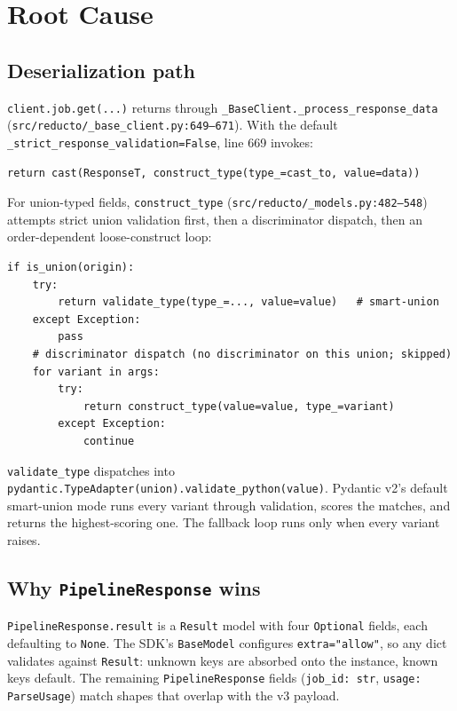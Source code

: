 \documentclass[11pt]{article}
\begin{document}
\section{Root Cause}

\subsection{Deserialization path}

\texttt{client.job.get(...)} returns through \texttt{\_BaseClient.\_process\_response\_data} (\texttt{src/reducto/\_base\_client.py:649--671}). With the default \texttt{\_strict\_response\_validation=False}, line 669 invokes:

\begin{lstlisting}[style=py]
return cast(ResponseT, construct_type(type_=cast_to, value=data))
\end{lstlisting}

For union-typed fields, \texttt{construct\_type} (\texttt{src/reducto/\_models.py:482--548}) attempts strict union validation first, then a discriminator dispatch, then an order-dependent loose-construct loop:

\begin{lstlisting}[style=py]
if is_union(origin):
    try:
        return validate_type(type_=..., value=value)   # smart-union
    except Exception:
        pass
    # discriminator dispatch (no discriminator on this union; skipped)
    for variant in args:
        try:
            return construct_type(value=value, type_=variant)
        except Exception:
            continue
\end{lstlisting}

\texttt{validate\_type} dispatches into \texttt{pydantic.TypeAdapter(union).validate\_python(value)}. Pydantic v2's default smart-union mode runs every variant through validation, scores the matches, and returns the highest-scoring one. The fallback loop runs only when every variant raises.

\subsection{Why \texttt{PipelineResponse} wins}

\texttt{PipelineResponse.result} is a \texttt{Result} model with four \texttt{Optional} fields, each defaulting to \texttt{None}. The SDK's \texttt{BaseModel} configures \texttt{extra="allow"}, so any dict validates against \texttt{Result}: unknown keys are absorbed onto the instance, known keys default. The remaining \texttt{PipelineResponse} fields (\texttt{job\_id: str}, \texttt{usage: ParseUsage}) match shapes that overlap with the v3 payload.
\end{document}
